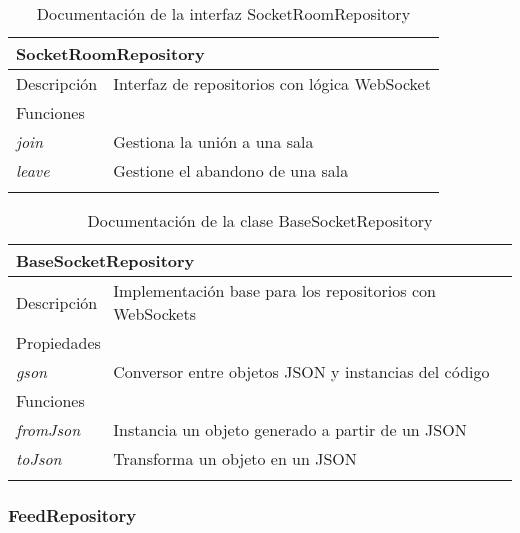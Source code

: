 \vspace{-20pt}
\begin{longtable}{|p{} p{}|}
    \hline
    \multicolumn{2}{|l|}{\textbf{SocketRoomRepository}} \\ \hline \hline
    Descripción      & Interfaz de repositorios con lógica WebSocket \\ \hline
    \multicolumn{2}{|l|}{Funciones} \\
    \emph{join}  & Gestiona la unión a una sala  \\ 
    \emph{leave}  & Gestione el abandono de una sala  \\ \hline
    \caption{Documentación de la interfaz SocketRoomRepository}
    \label{dis:app:socket_room_repository}
\end{longtable}

\vspace{-20pt}
\begin{longtable}{|p{} p{}|}
    \hline
    \multicolumn{2}{|l|}{\textbf{BaseSocketRepository}} \\ \hline \hline
    Descripción      & Implementación base para los repositorios con WebSockets \\ \hline
    \multicolumn{2}{|l|}{Propiedades} \\
    \emph{gson}  & Conversor entre objetos JSON y instancias del código \\ \hline
    \multicolumn{2}{|l|}{Funciones} \\
    \emph{fromJson}  & Instancia un objeto generado a partir de un JSON  \\ 
    \emph{toJson}  & Transforma un objeto en un JSON  \\ \hline
    \caption{Documentación de la clase BaseSocketRepository}
    \label{dis:app:base_socket_repository}
\end{longtable}

\subsubsection{FeedRepository}

